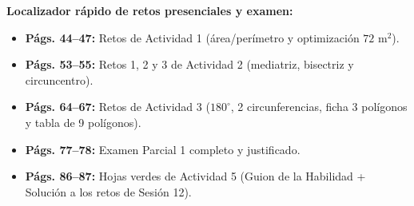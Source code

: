 \documentclass[spanish,letterpaper,oneside]{article}
\begin{document}
\vspace{0.6cm}
\noindent\colorbox{iiiepePale}{%
  \parbox{\dimexpr\textwidth-2\fboxsep\relax}{%
    \small\textbf{Localizador rápido de retos presenciales y examen:}
    \begin{itemize}\setlength{\itemsep}{2pt}\setlength{\topsep}{2pt}
      \item \textbf{Págs. 44--47:} Retos de Actividad 1 (área/perímetro y optimización $72\text{ m}^2$).
      \item \textbf{Págs. 53--55:} Retos 1, 2 y 3 de Actividad 2 (mediatriz, bisectriz y circuncentro).
      \item \textbf{Págs. 64--67:} Retos de Actividad 3 ($180^\circ$, 2 circunferencias, ficha 3 polígonos y tabla de 9 polígonos).
      \item \textbf{Págs. 77--78:} Examen Parcial 1 completo y justificado.
      \item \textbf{Págs. 86--87:} Hojas verdes de Actividad 5 (Guion de la Habilidad + Solución a los retos de Sesión 12).
    \end{itemize}
  }%
}
\end{document}
